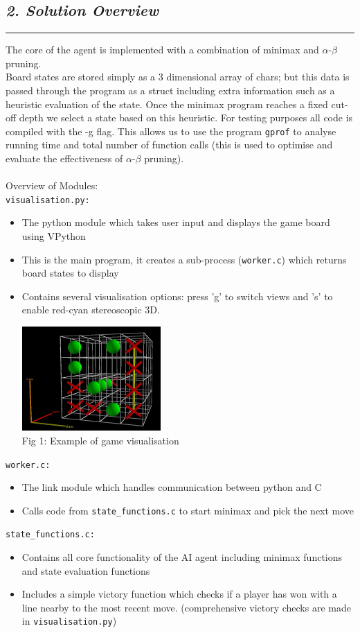 \documentclass[10pt]{article}
\begin{document}
\begin{multicols}{2}
\subsection*{\emph { \textmd{2. Solution Overview}}}
\hrule
\vspace{0.4cm}
The core of the agent is implemented with a combination of minimax and $\alpha$-$\beta$ pruning.\\
Board states are stored simply as a 3 dimensional array of chars; but this data is passed
through the program as a struct including extra information such as a heuristic evaluation
of the state. Once the minimax program reaches a fixed cut-off depth we select a state based on
this heuristic. For testing purposes all code is compiled with the -g flag. This allows
us to use the program \texttt{gprof} to analyse running time and total number of function calls
(this is used to optimise and evaluate the effectiveness of $\alpha$-$\beta$ pruning).\\\\
Overview of Modules:\\
\texttt{visualisation.py:}
\begin{itemize}
\item The python module which takes user input and displays the game board using VPython
\item This is the main program, it creates a sub-process (\texttt{worker.c}) which returns
board states to display
\item Contains several visualisation options: press 'g' to switch views and 's' to enable
red-cyan stereoscopic 3D.
\begin{center}
\includegraphics[width=5.3cm]{vis.jpg}\\
{\small Fig 1: Example of game visualisation}
\columnbreak
\end{center}
\end{itemize}
\texttt{worker.c:}
\begin{itemize}
\item The link module which handles communication between python and C
\item Calls code from \texttt{state\_functions.c} to start minimax and pick the next move
\end{itemize}
\texttt{state\_functions.c:}
\begin{itemize}
\item Contains all core functionality of the AI agent including minimax functions and state
evaluation functions
\item Includes a simple victory function which checks if a player has won with a line nearby to
the most recent move. (comprehensive victory checks are made in \texttt{visualisation.py})
\end{itemize}


\end{multicols}
\end{document}
